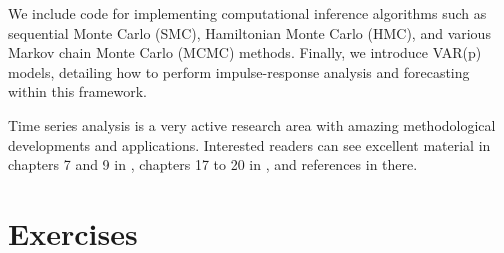 We include code for implementing computational inference algorithms such as sequential Monte Carlo (SMC), Hamiltonian Monte Carlo (HMC), and various Markov chain Monte Carlo (MCMC) methods. Finally, we introduce VAR(p) models, detailing how to perform impulse-response analysis and forecasting within this framework.

Time series analysis is a very active research area with amazing methodological developments and applications. Interested readers can see excellent material in chapters 7 and 9 in \cite{geweke2011oxford}, chapters 17 to 20 in \cite{chan2019bayesian}, and references in there.

\section{Exercises}\label{sec86}

